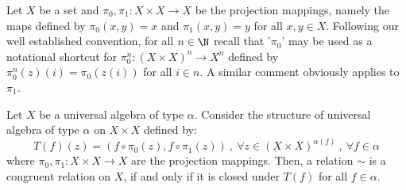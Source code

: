 Let $X$ be a set and $\pi_{0},\pi_{1}:X\times X\to X$ be the
projection mappings, namely the maps defined by $\pi_{0}(x,y)=x$ and
$\pi_{1}(x,y)=y$ for all $x,y\in X$. Following our well established
convention, for all $n\in\N$ recall that '$\pi_{0}$' may be used as
a notational shortcut for $\pi_{0}^{n}:(X\times X)^{n}\to X^{n}$
defined by $\pi_{0}^{n}(z)(i)=\pi_{0}(z(i))$ for all $i\in n$. A
similar comment obviously applies to $\pi_{1}$.
\begin{lemma}\label{logic:lemma:congruent}
Let $X$ be a universal algebra of type $\alpha$. Consider the
structure of universal algebra of type $\alpha$ on $X\times X$
defined by:
    \[
    T(f)(z) = (f\circ \pi_{0}(z),f\circ\pi_{1}(z))\ ,\ \forall z\in (X\times X)^{\alpha(f)}\ ,\ \forall f\in\alpha
    \]
where $\pi_{0},\pi_{1}:X\times X\to X$ are the projection mappings.
Then, a relation $\sim$ is a congruent relation on $X$, if and only
if it is closed under $T(f)$ for all $f\in\alpha$.
\end{lemma}
